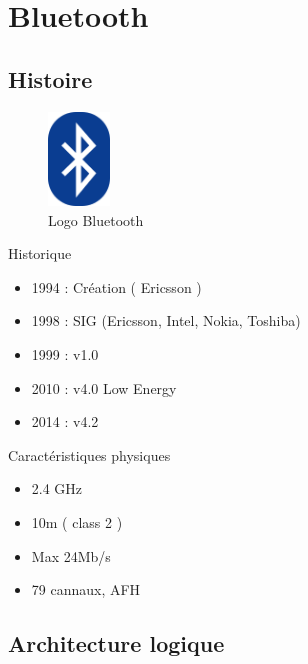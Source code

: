 \section{Bluetooth}
\subsection{Histoire}
\begin{frame}

\begin{minipage}[t]{0.25\linewidth}

\begin{figure}
\includegraphics[height=2.5cm]{bt_logo.png}
\caption{Logo Bluetooth}
\end{figure}

\end{minipage}\hfill
\begin{minipage}[t]{0.72\linewidth}
\begin{block}{Historique}
\begin{itemize}
	\item 1994 : Création ( Ericsson )
	\item 1998 : SIG (Ericsson, Intel, Nokia, Toshiba)
	\item 1999 : v1.0
	\item 2010 : v4.0 Low Energy
	\item 2014 : v4.2
\end{itemize}
\end{block}
\begin{block}{Caractéristiques physiques}
\begin{itemize}
\item 2.4 GHz
\item 10m ( class 2 )
\item Max 24Mb/s
\item 79 cannaux, AFH
\end{itemize}
\end{block}

\end{minipage}
\end{frame}

\subsection{Architecture logique}

